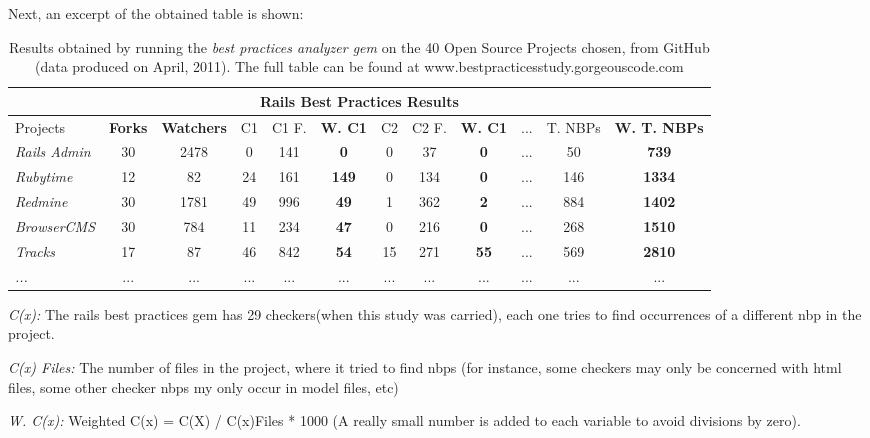 Next, an excerpt of the obtained table is shown:
\begin{table}[H]
\begin{center}
{\scriptsize
\begin{threeparttable}
\begin{tabular}{|l||c|c|c|c|c|c|c|c|c|c|c|} \hline
\multicolumn{12}{|c|}{Rails Best Practices Results} \\ \hline
Projects & \textbf{Forks}         & \textbf{Watchers} & 
C1       & C1 F.                  & \textbf{W. C1} & 
C2       & C2 F.                  & \textbf{W.       C1} & 
...      & T. NBPs                & \textbf{W.  T. NBPs} \\\hline\hline
\emph{Rails Admin } & 30 & 2478 &  0 & 141 & \textbf{  0 }&  0 &  37 & \textbf{ 0} & ...&  50 & \textbf{ 739}  \\ \hline
\emph{Rubytime    } & 12 &   82 & 24 & 161 & \textbf{149 }&  0 & 134 & \textbf{ 0} & ...& 146 & \textbf{1334}  \\ \hline
\emph{Redmine     } & 30 & 1781 & 49 & 996 & \textbf{ 49 }&  1 & 362 & \textbf{ 2} & ...& 884 & \textbf{1402}  \\ \hline
\emph{BrowserCMS  } & 30 &  784 & 11 & 234 & \textbf{ 47 }&  0 & 216 & \textbf{ 0} & ...& 268 & \textbf{1510}  \\ \hline
\emph{Tracks      } & 17 &   87 & 46 & 842 & \textbf{ 54 }& 15 & 271 & \textbf{55} & ...& 569 & \textbf{2810}  \\ \hline
\emph{...}&...&...&...&...&...&...&...&...&...&...&...\\ \hline
\end{tabular} 

\begin{tablenotes}
  \item{ \emph{C(x): }} The rails best practices gem has 29 checkers(when this study was carried), each one tries to find occurrences of a different nbp in the project. 
  \item{\emph{C(x) Files: }} The number of files in the project, where it tried to find nbps (for instance, some checkers may only be concerned with html files, some other checker nbps my only occur in model files, etc)
  \item{\emph{W. C(x): }} Weighted C(x) = C(X) / C(x)Files * 1000 (A really small number is added to each variable to avoid divisions by zero).
\end{tablenotes}
\end{threeparttable}
}
\end{center}
\caption{Results obtained by running the \emph{best practices analyzer gem} on the 40 Open Source Projects chosen, from GitHub (data produced on April, 2011). The full table can be found at www.bestpracticesstudy.gorgeouscode.com}
\end{table}

